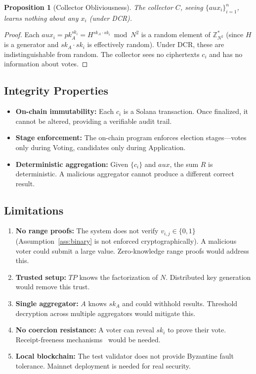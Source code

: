 \documentclass[11pt, a4paper]{article}
\newtheorem{proposition}[theorem]{Proposition}
\begin{document}
\begin{proposition}[Collector Obliviousness]\label{prop:collector}
The collector $C$, seeing $\{aux_i\}_{i=1}^n$, learns nothing about any $x_i$ (under DCR).
\end{proposition}

\begin{proof}
Each $aux_i = pk_A^{sk_i} = H^{sk_A \cdot sk_i} \bmod N^2$ is a random element of $\mathbb{Z}_{N^2}^*$ (since $H$ is a generator and $sk_A \cdot sk_i$ is effectively random). Under DCR, these are indistinguishable from random. The collector sees no ciphertexts $c_i$ and has no information about votes.
\end{proof}

\subsection{Integrity Properties}

\begin{itemize}[leftmargin=*]
    \item \textbf{On-chain immutability:} Each $c_i$ is a Solana transaction. Once finalized, it cannot be altered, providing a verifiable audit trail.
    \item \textbf{Stage enforcement:} The on-chain program enforces election stages---votes only during Voting, candidates only during Application.
    \item \textbf{Deterministic aggregation:} Given $\{c_i\}$ and $aux$, the sum $R$ is deterministic. A malicious aggregator cannot produce a different correct result.
\end{itemize}

\subsection{Limitations}

\begin{enumerate}[leftmargin=*]
    \item \textbf{No range proofs:} The system does not verify $v_{i,j} \in \{0,1\}$ (Assumption~\ref{ass:binary} is not enforced cryptographically). A malicious voter could submit a large value. Zero-knowledge range proofs would address this.
    \item \textbf{Trusted setup:} $TP$ knows the factorization of $N$. Distributed key generation would remove this trust.
    \item \textbf{Single aggregator:} $A$ knows $sk_A$ and could withhold results. Threshold decryption across multiple aggregators would mitigate this.
    \item \textbf{No coercion resistance:} A voter can reveal $sk_i$ to prove their vote. Receipt-freeness mechanisms~\cite{kiayias2008civitas} would be needed.
    \item \textbf{Local blockchain:} The test validator does not provide Byzantine fault tolerance. Mainnet deployment is needed for real security.
\end{enumerate}
\end{document}
